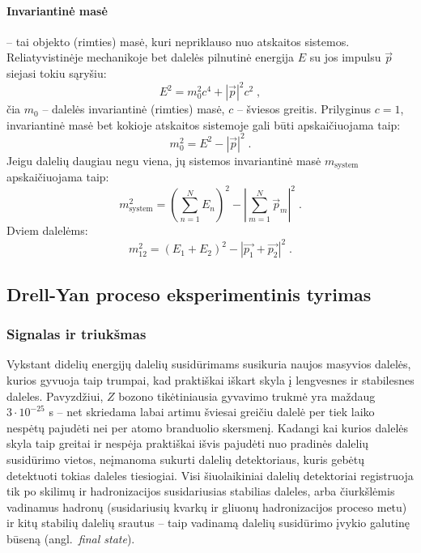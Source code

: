 \documentclass[a4paper, 12pt]{article}
\newlength\q
\begin{document}
\paragraph{Invariantinė masė} -- tai objekto (rimties) masė, kuri nepriklauso nuo atskaitos sistemos.
Reliatyvistinėje mechanikoje bet dalelės pilnutinė energija $E$ su jos impulsu $\vec{p}$ siejasi tokiu sąryšiu:
\begin{equation}
E^{2}=m_{0}^{2}c^{4} + \left| \vec{p} \right|^{2}c^{2} \; \mathrm{,}
\label{eq:relativity}
\end{equation}
čia $m_{0}$ -- dalelės invariantinė (rimties) masė, $c$ -- šviesos greitis. Prilyginus $c=1$, invariantinė masė bet kokioje atskaitos sistemoje gali būti apskaičiuojama taip:
\begin{equation}
m_{0}^{2}=E^{2}-|\vec{p}|^{2} \; .
\label{eq:invm}
\end{equation}
Jeigu dalelių daugiau negu viena, jų sistemos invariantinė masė $m_\mathrm{system}$ apskaičiuojama taip:
\begin{equation}
m_{\mathrm{system}}^{2}=\left(\sum_{n=1}^{N} E_{n}\right)^{2}-\left|\sum_{m=1}^{N} \vec{p}_{m}\right|^{2} \; .
\label{eq:minvm}
\end{equation}
Dviem dalelėms:
\begin{equation}
m_{12}^2=(E_{1}+E_{2})^{2}-|\vec{p_{1}}+\vec{p_{2}}|^{2} \; .
\label{eq:tinvm}
\end{equation}

\subsection{Drell-Yan proceso eksperimentinis tyrimas}

\subsubsection{Signalas ir triukšmas}
Vykstant didelių energijų dalelių susidūrimams susikuria naujos masyvios dalelės, kurios gyvuoja taip trumpai, kad praktiškai iškart skyla į lengvesnes ir stabilesnes daleles. Pavyzdžiui, $Z$ bozono tikėtiniausia gyvavimo trukmė yra maždaug $3\cdot10^{-25}$ s -- net skriedama labai artimu šviesai greičiu dalelė per tiek laiko nespėtų pajudėti nei per atomo branduolio skersmenį. Kadangi kai kurios dalelės skyla taip greitai ir nespėja praktiškai išvis pajudėti nuo pradinės dalelių susidūrimo vietos, neįmanoma sukurti dalelių detektoriaus, kuris gebėtų detektuoti tokias daleles tiesiogiai. Visi šiuolaikiniai dalelių detektoriai registruoja tik po skilimų ir hadronizacijos susidariusias stabilias daleles, arba čiurkšlėmis vadinamus hadronų (susidariusių kvarkų ir gliuonų hadronizacijos proceso metu) ir kitų stabilių dalelių srautus -- taip vadinamą dalelių susidūrimo įvykio galutinę būseną (angl.\ \textit{final state}).
\end{document}
